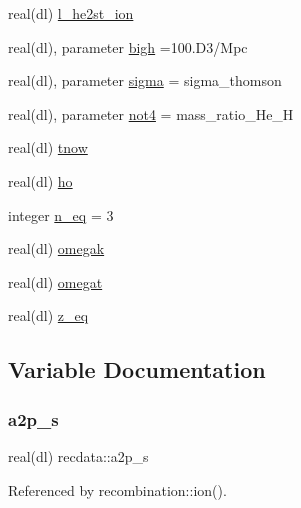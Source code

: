 \begin{DoxyCompactItemize}
\item 
real(dl) \mbox{\hyperlink{namespacerecdata_a19e8a17a31cb50954e10fa514602a043}{l\+\_\+he2st\+\_\+ion}}
\item 
real(dl), parameter \mbox{\hyperlink{namespacerecdata_a6d6695fdf7d29c72eb628457a9d2f8e8}{bigh}} =100.\+D3/\+Mpc
\item 
real(dl), parameter \mbox{\hyperlink{namespacerecdata_ad6030407673dc2717b2b8fb28662bd2e}{sigma}} = sigma\+\_\+thomson
\item 
real(dl), parameter \mbox{\hyperlink{namespacerecdata_affbfe58acc402b3952d720558fbd9344}{not4}} = mass\+\_\+ratio\+\_\+\+He\+\_\+H
\item 
real(dl) \mbox{\hyperlink{namespacerecdata_ab35ca0eb7ecb1758876e6e979df99bb9}{tnow}}
\item 
real(dl) \mbox{\hyperlink{namespacerecdata_a8f24dbf21d381a21986562167870de9b}{ho}}
\item 
integer \mbox{\hyperlink{namespacerecdata_a8ab5b420c3994ec0bbf10dd045a1c61d}{n\+\_\+eq}} = 3
\item 
real(dl) \mbox{\hyperlink{namespacerecdata_ad15940a7af68a80f1c36cd8e55395adf}{omegak}}
\item 
real(dl) \mbox{\hyperlink{namespacerecdata_a1b83b45446a75acd6c94310302246fd6}{omegat}}
\item 
real(dl) \mbox{\hyperlink{namespacerecdata_aba42d5992f637f77caa48a71505fc69d}{z\+\_\+eq}}
\end{DoxyCompactItemize}


\subsection{Variable Documentation}
\mbox{\label{namespacerecdata_ab0a23c356e59d53950e7536cf79fe3cd}} 
\subsubsection{\texorpdfstring{a2p\+\_\+s}{a2p\_s}}
{\footnotesize\ttfamily real(dl) recdata\+::a2p\+\_\+s}



Referenced by recombination\+::ion().

\mbox{\label{namespacerecdata_a34c7f7e2605d273b585ab3de74345d16}} 
